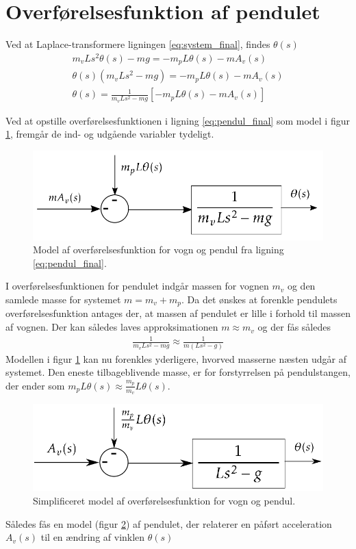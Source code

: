 \section{Overførelsesfunktion af pendulet}\label{sec:sec_penduloverforelse}
Ved at Laplace-transformere ligningen \ref{eq:system_final}, findes $\theta(s)$
\begin{align}
 m_vLs^2\theta(s) - mg = -m_pL\theta(s) -mA_v(s) \\
 \theta(s)\left(m_vLs^2 - mg \right) = -m_pL\theta(s) -mA_v(s) \\
 \theta(s) = \frac{1}{m_vLs^2 - mg }\left[-m_pL\theta(s) -mA_v(s)\right] \label{eq:pendul_final}
\end{align} 
 
Ved at opstille overførelsesfunktionen i ligning \ref{eq:pendul_final} som model i figur \ref{fig:pendul_trans1}, fremgår de ind- og udgående variabler tydeligt. 

\begin{figure}[h!]
	\centering
	\includegraphics[width=.6\textwidth]{billeder/pendul_trans1.png}
	\caption[Model af overførelsesfunktion for vogn og pendul.]{Model af overførelsesfunktion for vogn og pendul fra ligning \ref{eq:pendul_final}.}
	\label{fig:pendul_trans1}
\end{figure}
\FloatBlock

I overførelsesfunktionen for pendulet indgår massen for vognen $m_v$ og den samlede masse for systemet $m = m_v + m_p$.
Da det ønskes at forenkle pendulets overførelsesfunktion antages der, at massen af pendulet er lille i forhold til massen af vognen. 
Der kan således laves approksimationen $m \approx m_v$ og der fås således
\begin{align}
\frac{1}{m_vLs^2 - mg } \approx  \frac{1}{m \left( Ls^2 - g \right) } 
\end{align}
Modellen i figur \ref{fig:pendul_trans1} kan nu forenkles yderligere, hvorved masserne næsten udgår af systemet.
Den eneste tilbageblivende masse, er for forstyrrelsen på pendulstangen, der ender som $m_pL\theta(s) \approx  \frac{m_p}{m_v}L\theta(s) $.

\begin{figure}[h!]
	\centering
	\includegraphics[width=.6\textwidth]{billeder/pendul_trans_clean.png}
	\caption{Simplificeret model af overførelsesfunktion for vogn og pendul.}
	\label{fig:pendul_trans_clean}
\end{figure}
\FloatBlock 
Således fås en model (figur \ref{fig:pendul_trans_clean}) af pendulet, der relaterer en påført acceleration $A_v(s)$ til en ændring af vinklen $\theta(s)$
